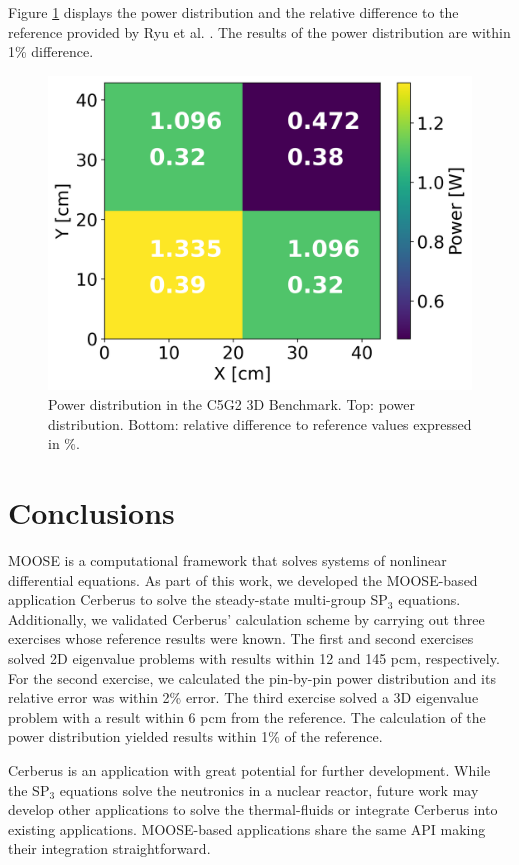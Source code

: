 \documentclass{anstrans}
\begin{document}
Figure \ref{fig:c5g2-3d-power} displays the power distribution and the relative
difference to the reference provided by Ryu et al. \cite{ryu_finite_2013}.
The results of the power distribution are within 1\% difference.

\begin{figure}[h] %
    \centering
    \includegraphics[width=0.65\linewidth]{figures/C5G23D-distrib.png}
    \hfill
    \caption{Power distribution in the C5G2 3D Benchmark. Top: power distribution. Bottom: relative difference to reference values expressed in \%.}
    \label{fig:c5g2-3d-power}
\end{figure}


\section{Conclusions}

MOOSE is a computational framework that solves systems of nonlinear differential equations.
As part of this work, we developed the MOOSE-based application Cerberus to solve the steady-state multi-group SP$_3$ equations.
Additionally, we validated Cerberus' calculation scheme by carrying out three exercises whose reference results were known.
The first and second exercises solved 2D eigenvalue problems with results within 12 and 145 pcm, respectively.
For the second exercise, we calculated the pin-by-pin power distribution and its relative error was within 2\% error.
The third exercise solved a 3D eigenvalue problem with a result within 6 pcm from the reference.
The calculation of the power distribution yielded results within 1\% of the reference.

Cerberus is an application with great potential for further development.
While the SP$_3$ equations solve the neutronics in a nuclear reactor, future work may develop other applications to solve the thermal-fluids or integrate Cerberus into existing applications.
MOOSE-based applications share the same API making their integration straightforward.
\end{document}
